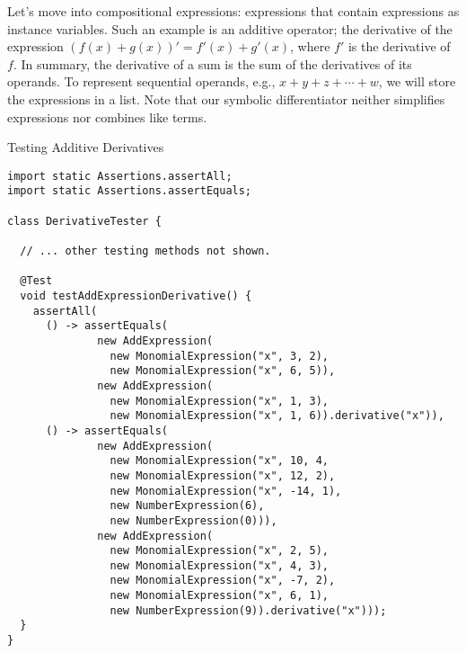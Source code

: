 Let's move into compositional expressions: expressions that contain expressions as instance variables. Such an example is an additive operator; the derivative of the expression $(f(x) + g(x))' = f'(x) + g'(x)$, where $f'$ is the derivative of $f$. In summary, the derivative of a sum is the sum of the derivatives of its operands. To represent sequential operands, e.g., $x + y + z + \cdots + w$, we will store the expressions in a list. Note that our symbolic differentiator neither simplifies expressions nor combines like terms.

\begin{cl}{Testing Additive Derivatives}
\begin{lstlisting}[language=MyJava]
import static Assertions.assertAll;
import static Assertions.assertEquals;
  
class DerivativeTester {
  
  // ... other testing methods not shown.

  @Test
  void testAddExpressionDerivative() {
    assertAll(
      () -> assertEquals(
              new AddExpression(
                new MonomialExpression("x", 3, 2),
                new MonomialExpression("x", 6, 5)),
              new AddExpression(
                new MonomialExpression("x", 1, 3),
                new MonomialExpression("x", 1, 6)).derivative("x")),
      () -> assertEquals(
              new AddExpression(
                new MonomialExpression("x", 10, 4,
                new MonomialExpression("x", 12, 2),
                new MonomialExpression("x", -14, 1),
                new NumberExpression(6),
                new NumberExpression(0))),
              new AddExpression(
                new MonomialExpression("x", 2, 5),
                new MonomialExpression("x", 4, 3),
                new MonomialExpression("x", -7, 2),
                new MonomialExpression("x", 6, 1),
                new NumberExpression(9)).derivative("x")));
  }
}
\end{lstlisting}
\end{cl}

